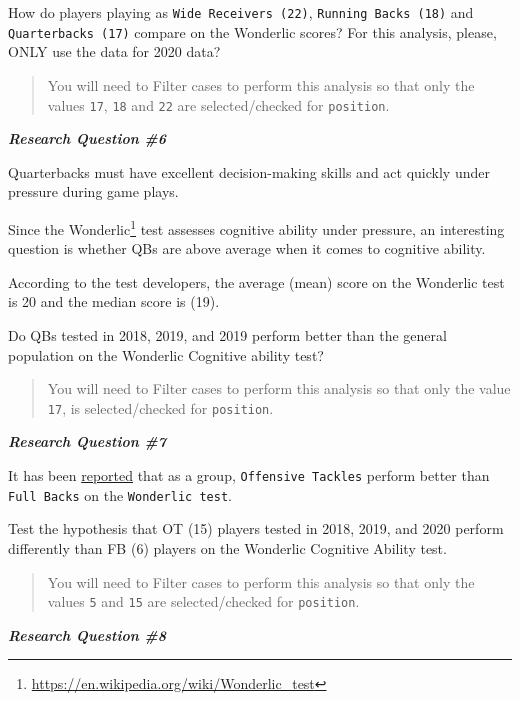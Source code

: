\documentclass[11pt,]{article}
\begin{document}
How do players playing as \texttt{Wide\ Receivers\ (22)},
\texttt{Running\ Backs\ (18)} and \texttt{Quarterbacks\ (17)} compare on
the Wonderlic scores? For this analysis, please, ONLY use the data for
2020 data?

\begin{quote}
You will need to Filter cases to perform this analysis so that only the
values \texttt{17}, \texttt{18} and \texttt{22} are selected/checked for
\texttt{position}.
\end{quote}

\textbf{\emph{Research Question \#6}}

Quarterbacks must have excellent decision-making skills and act quickly
under pressure during game plays.

Since the Wonderlic\footnote{\url{https://en.wikipedia.org/wiki/Wonderlic_test}}
test assesses cognitive ability under pressure, an interesting question
is whether QBs are above average when it comes to cognitive ability.

According to the test developers, the average (mean) score on the
Wonderlic test is 20 and the median score is (19).

Do QBs tested in 2018, 2019, and 2019 perform better than the general
population on the Wonderlic Cognitive ability test?

\begin{quote}
You will need to Filter cases to perform this analysis so that only the
value \texttt{17}, is selected/checked for \texttt{position}.
\end{quote}

\textbf{\emph{Research Question \#7}}

It has been
\href{https://www.cbssports.com/nfl/news/nfl-draft-combine-the-highest-and-lowest-wonderlic-test-scores-ever-recorded/}{reported}
that as a group, \texttt{Offensive\ Tackles} perform better than
\texttt{Full\ Backs} on the \texttt{Wonderlic\ test}.

Test the hypothesis that OT (15) players tested in 2018, 2019, and 2020
perform differently than FB (6) players on the Wonderlic Cognitive
Ability test.

\begin{quote}
You will need to Filter cases to perform this analysis so that only the
values \texttt{5} and \texttt{15} are selected/checked for
\texttt{position}.
\end{quote}

\textbf{\emph{Research Question \#8}}
\end{document}
